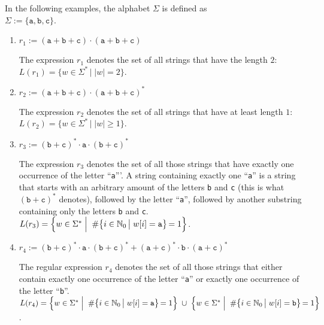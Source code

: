 \examplesEng
In the following examples, the alphabet  $\Sigma$ is defined as
\\[0.2cm]
\hspace*{1.3cm}
$\Sigma := \{ \texttt{a}, \texttt{b}, \texttt{c} \}$.
\begin{enumerate}
\item $r_1 := (\texttt{a} + \texttt{b} + \texttt{c}) \cdot (\texttt{a} + \texttt{b} + \texttt{c})$

      The expression  $r_1$ denotes the set of all strings that have the length $2$:
      \\[0.2cm]
      \hspace*{1.3cm}
      $L(r_1) = \bigl\{ w \in \Sigma^* \,\big|\; |w| = 2 \bigr\}$.
\item $r_2 := (\texttt{a} + \texttt{b} + \texttt{c}) \cdot (\texttt{a} + \texttt{b} + \texttt{c})^*$

      The expression  $r_2$ denotes the set of all strings that have at least length $1$:
      \\[0.2cm]
      \hspace*{1.3cm}
      $L(r_2) = \bigl\{ w \in \Sigma^* \,\big|\; |w| \geq 1 \bigr\}$.
\item $r_3 := (\texttt{b} + \texttt{c})^* \cdot \texttt{a} \cdot 
              (\texttt{b} + \texttt{c})^*$

      The expression $r_3$ denotes the set of all those strings that have exactly one occurrence of
      the letter ``\texttt{a}'''.  A string containing exactly one ``\texttt{a}''
      is a string that starts with an arbitrary amount of the letters \texttt{b} and \texttt{c} 
      (this is what $(\texttt{b} + \texttt{c})^*$ denotes), followed by the letter ``\texttt{a}'',
      followed by another substring containing only the letters \texttt{b} and \texttt{c}.
      \\[0.2cm]
      \hspace*{1.3cm}
      $L(r_3) = \Bigl\{ w \in \Sigma^* \;\Big|\;\; 
                        \#\bigl\{i \in  \mathbb{N}_0 \,\big|\; w[i] = \texttt{a} \bigl\} \,= 1 \Bigr\}$.
\item $r_4 :=  (\texttt{b} + \texttt{c})^* \cdot \texttt{a} \cdot (\texttt{b} + \texttt{c})^* +
               (\texttt{a} + \texttt{c})^* \cdot \texttt{b} \cdot (\texttt{a} + \texttt{c})^*$

      The regular expression $r_4$ denotes the set of all those strings that either contain exactly
      one occurrence of the letter ``\texttt{a}'' or exactly one occurrence of the letter ``\texttt{b}''.
      \\[0.2cm]
      \hspace*{0.3cm}
      $L(r_4) = \Bigl\{ w \in \Sigma^* \;\Big|\;\; 
                        \#\bigl\{i \in \mathbb{N}_0 \,\big|\; w[i] = \texttt{a} \bigl\} \,=
                        1 \Bigr\} \;\cup\;
                \Bigl\{ w \in \Sigma^* \;\Big|\;\; 
                        \#\bigl\{i \in \mathbb{N}_0 \,\big|\; w[i] = \texttt{b} \bigl\} \,=
                        1 \Bigr\}$.  \eox 
\end{enumerate}

